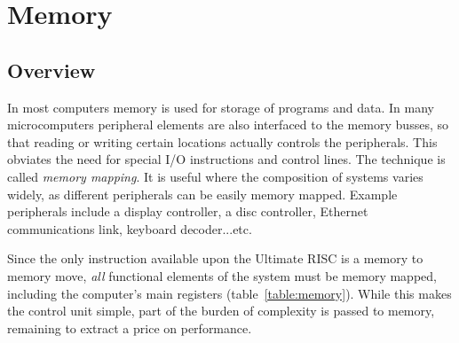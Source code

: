 \chapter{Memory}
\section{Overview}
In most computers  memory is used for storage of programs and data.
In many microcomputers peripheral elements are  also interfaced to the memory busses,
so that reading or writing certain locations actually controls the peripherals.
This obviates the need for special I/O instructions and control lines.
The technique is called {\em memory mapping}. 
It is useful where the composition  of systems varies widely, as different peripherals can be easily memory mapped. 
Example peripherals include a display controller, a disc controller, Ethernet communications link, keyboard decoder...etc. 

Since the only instruction available upon the Ultimate RISC is a memory to memory move, {\em all} functional elements of the system must be memory mapped, including the computer's main registers (table~\ref{table:memory}).
While this makes the control unit simple, part of the burden of complexity is passed to memory, remaining to extract a price on performance.


